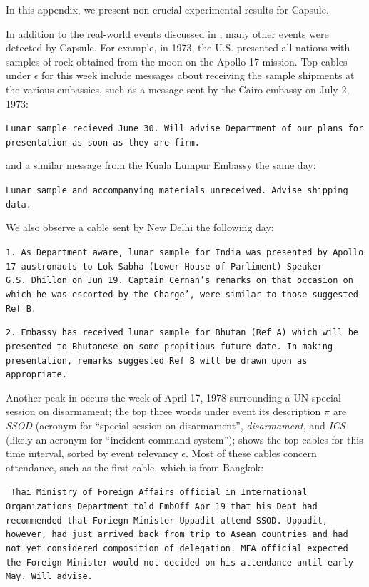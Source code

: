 
In this appendix, we present non-crucial experimental results for Capsule.


In addition to the real-world events discussed in , many other events were detected by Capsule.  For example, in 1973, the U.S. presented all nations with samples of rock obtained from the moon on the Apollo 17 mission.  Top cables under $\epsilon$ for this week include messages about receiving the sample shipments at the various embassies, such as a message sent by the Cairo embassy on July 2, 1973:
\begin{shaded*} \tt{Lunar sample recieved June 30.  Will advise Department of our plans for presentation as soon as they are firm.}
\end{shaded*}
\noindent and a similar message from the Kuala Lumpur Embassy the same day:
\begin{shaded*} \tt{Lunar sample and accompanying materials unreceived. Advise shipping data.}
\end{shaded*}
\noindent We also observe a cable sent by New Delhi the following day:
\begin{shaded*} \tt{1. As Department aware, lunar sample for India was presented by Apollo 17 austronauts to Lok Sabha (Lower House of Parliment) Speaker G.S.~Dhillon on Jun 19.
Captain Cernan's remarks on that occasion on which he was escorted by the Charge',
were similar to those suggested Ref B.}

\tt{2. Embassy has received lunar sample for Bhutan (Ref A) which will be presented to Bhutanese on some propitious future date.
In making presentation, remarks suggested Ref B will be drawn upon as appropriate.}
\end{shaded*}


Another peak in  occurs the week of April 17, 1978 surrounding a UN special session on disarmament; the top three words under event its description $\pi$ are \emph{SSOD} (acronym for ``special session on disarmament'', \emph{disarmament}, and \emph{ICS} (likely an acronym for ``incident command system'');  shows the top cables for this time interval, sorted by event relevancy $\epsilon$.  Most of these cables concern attendance, such as the first cable, which is from Bangkok:
\begin{shaded*} \tt{
Thai Ministry of Foreign Affairs official in International Organizations Department told EmbOff Apr 19 that his Dept had recommended that Foriegn Minister Uppadit attend SSOD. 
Uppadit, however, had just arrived back from trip to Asean
countries and had not yet considered composition of delegation.
MFA official expected the Foreign Minister would not decided
on his attendance until early May. Will advise.}
\end{shaded*}

